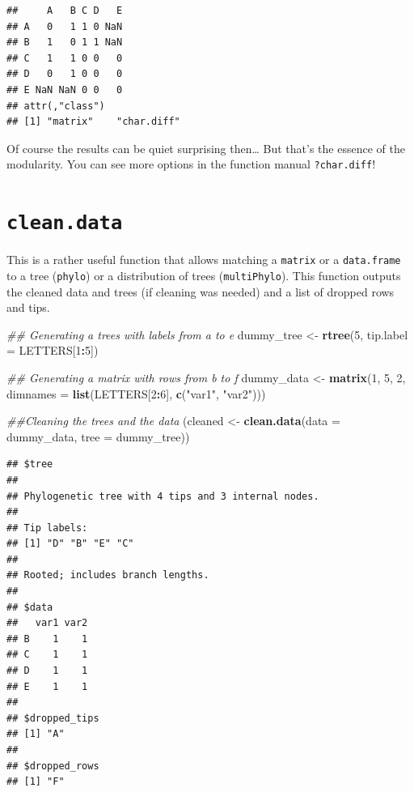 \documentclass[]{book}
\newenvironment{Shaded}{\begin{snugshade}}{\end{snugshade}}
\newcommand{\CommentTok}[1]{\textcolor[rgb]{0.56,0.35,0.01}{\textit{#1}}}
\newcommand{\DataTypeTok}[1]{\textcolor[rgb]{0.13,0.29,0.53}{#1}}
\newcommand{\DecValTok}[1]{\textcolor[rgb]{0.00,0.00,0.81}{#1}}
\newcommand{\KeywordTok}[1]{\textcolor[rgb]{0.13,0.29,0.53}{\textbf{#1}}}
\newcommand{\NormalTok}[1]{#1}
\newcommand{\OperatorTok}[1]{\textcolor[rgb]{0.81,0.36,0.00}{\textbf{#1}}}
\newcommand{\StringTok}[1]{\textcolor[rgb]{0.31,0.60,0.02}{#1}}
\begin{document}
\begin{verbatim}
##     A   B C D   E
## A   0   1 1 0 NaN
## B   1   0 1 1 NaN
## C   1   1 0 0   0
## D   0   1 0 0   0
## E NaN NaN 0 0   0
## attr(,"class")
## [1] "matrix"    "char.diff"
\end{verbatim}

Of course the results can be quiet surprising then\ldots{} But that's the essence of the modularity. You can see more options in the function manual \texttt{?char.diff}!

\hypertarget{clean.data}{%
\section{\texorpdfstring{\texttt{clean.data}}{clean.data}}\label{clean.data}}

This is a rather useful function that allows matching a \texttt{matrix} or a \texttt{data.frame} to a tree (\texttt{phylo}) or a distribution of trees (\texttt{multiPhylo}).
This function outputs the cleaned data and trees (if cleaning was needed) and a list of dropped rows and tips.

\begin{Shaded}
\begin{Highlighting}[]
\CommentTok{## Generating a trees with labels from a to e}
\NormalTok{dummy_tree <-}\StringTok{ }\KeywordTok{rtree}\NormalTok{(}\DecValTok{5}\NormalTok{, }\DataTypeTok{tip.label =}\NormalTok{ LETTERS[}\DecValTok{1}\OperatorTok{:}\DecValTok{5}\NormalTok{])}

\CommentTok{## Generating a matrix with rows from b to f}
\NormalTok{dummy_data <-}\StringTok{ }\KeywordTok{matrix}\NormalTok{(}\DecValTok{1}\NormalTok{, }\DecValTok{5}\NormalTok{, }\DecValTok{2}\NormalTok{, }\DataTypeTok{dimnames =} \KeywordTok{list}\NormalTok{(LETTERS[}\DecValTok{2}\OperatorTok{:}\DecValTok{6}\NormalTok{], }\KeywordTok{c}\NormalTok{(}\StringTok{"var1"}\NormalTok{, }\StringTok{"var2"}\NormalTok{)))}

\CommentTok{##Cleaning the trees and the data}
\NormalTok{(cleaned <-}\StringTok{ }\KeywordTok{clean.data}\NormalTok{(}\DataTypeTok{data =}\NormalTok{ dummy_data, }\DataTypeTok{tree =}\NormalTok{ dummy_tree))}
\end{Highlighting}
\end{Shaded}

\begin{verbatim}
## $tree
## 
## Phylogenetic tree with 4 tips and 3 internal nodes.
## 
## Tip labels:
## [1] "D" "B" "E" "C"
## 
## Rooted; includes branch lengths.
## 
## $data
##   var1 var2
## B    1    1
## C    1    1
## D    1    1
## E    1    1
## 
## $dropped_tips
## [1] "A"
## 
## $dropped_rows
## [1] "F"
\end{verbatim}
\end{document}
